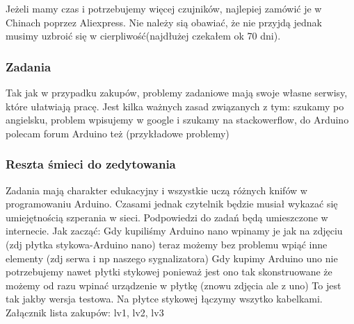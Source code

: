 Jeżeli mamy czas i potrzebujemy więcej czujników, najlepiej zamówić je w Chinach poprzez Aliexpress. Nie należy sią obawiać, że nie przyjdą jednak musimy uzbroić się w cierpliwość(najdłużej czekałem ok 70 dni).

\subsubsection{Zadania}
Tak jak w przypadku zakupów, problemy zadaniowe mają swoje własne serwisy, które ułatwiają pracę. Jest kilka ważnych zasad związanych z tym: szukamy po angielsku, problem wpisujemy w google i szukamy na stackowerflow, do Arduino polecam forum Arduino też (przykładowe problemy)
\subsubsection{Reszta śmieci do zedytowania}
Zadania mają charakter edukacyjny i wszystkie uczą różnych knifów w programowaniu Arduino. Czasami jednak czytelnik będzie musiał wykazać się umiejętnością szperania w sieci. Podpowiedzi do zadań będą umieszczone w internecie.
Jak zacząć:
Gdy kupiliśmy Arduino nano wpinamy je jak na zdjęciu (zdj płytka stykowa-Arduino nano) teraz możemy bez problemu wpiąć inne elementy (zdj serwa i np naszego sygnalizatora)
Gdy kupimy Arduino uno nie potrzebujemy nawet płytki stykowej ponieważ jest ono tak skonstruowane że możemy od razu wpinać urządzenie w płytkę
(znowu zdjęcia ale z uno)
To jest tak jakby wersja testowa. Na płytce stykowej łączymy wszytko kabelkami.
Załącznik lista zakupów: lv1, lv2, lv3

